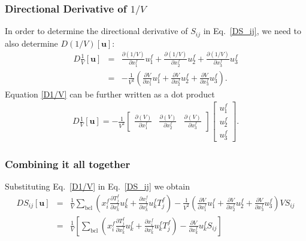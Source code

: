 \subsubsection{Directional Derivative of $1/V$}

In order to determine the directional derivative of $S_{ij}$ in Eq.\ \eqref{DS_ij}, we need to also determine $D \left(1/V\right) [\textbf{u}]$:
%
\begin{eqnarray}
D \frac{1}{V}[\textbf{u}] &=& \frac{\partial (1/V)}{\partial x_1^f} u_1^f + \frac{\partial (1/V)}{\partial x_2^f} u_2^f + \frac{\partial (1/V)}{\partial x_3^f} u_3^f \nonumber\\
%
&=& -\frac{1}{V^2} \left( \frac{\partial V}{\partial x_1^f} u_1^f + \frac{\partial V}{\partial x_2^f} u_2^f + \frac{\partial V}{\partial x_3^f} u_3^f \right).
\label{D1/V}
\end{eqnarray}
%
Equation \eqref{D1/V} can be further written as a dot product
%
\begin{eqnarray}
D\frac{1}{V}[\textbf{u}] = -\frac{1}{V^2}
\begin{bmatrix}
\frac{\partial (V)}{\partial x_1^f} & \frac{\partial (V)}{\partial x_2^f} & \frac{\partial(V)}{\partial x_3^f}
\end{bmatrix}
%
\begin{bmatrix}
u_1^f \\ u_2^f \\ u_3^f
\end{bmatrix}.
\label{D1/V_matrix}
\end{eqnarray}
%

\subsubsection{Combining it all together}

Substituting Eq.\ \eqref{D1/V} in Eq.\ \eqref{DS_ij} we obtain
%
\begin{eqnarray}
DS_{ij}[\textbf{u}] &=&  \frac{1}{V} \sum_{\text{bcl}} \left(x_i^f \frac{\partial T_j^f}{\partial x_k^f} u_k^f + \frac{\partial x_i^f}{\partial x_k^f}u_k^f T_j^f \right) -\frac{1}{V^2} \left( \frac{\partial V}{\partial x_1^f} u_1^f + \frac{\partial V}{\partial x_2^f} u_2^f + \frac{\partial V}{\partial x_3^f} u_3^f \right) V S_{ij} \nonumber\\
%
&=&  \frac{1}{V} \left[ \sum_{\text{bcl}} \left(x_i^f \frac{\partial T_j^f}{\partial x_k^f} u_k^f + \frac{\partial x_i^f}{\partial x_k^f}u_k^f T_j^f \right) -  \frac{\partial V}{\partial x_k^f} u_k^f S_{ij} \right]
\end{eqnarray}
%


